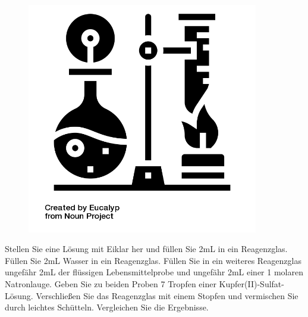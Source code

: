 \documentclass{scrartcl}  %
\begin{document}
		\begin{tcolorbox}[enhanced,
			colback=white,
			colframe=green!30!black,
			fonttitle=\sffamily\bfseries\large, 
			title=Durchführung,  %
			attach boxed title to top left={xshift=3.2mm,yshift=-0.50mm},
			boxed title style={skin=enhancedfirst jigsaw,size=small,arc=1mm,bottom=-1mm,colframe=green!50!black,height=0.75cm},
			colbacktitle=green!50!black,
			drop lifted shadow]
			\begin{figure}  
				\centering
				\vspace{-14pt}  %
				\includegraphics[width=0.9\textwidth]{symbols/symbol_tex_method}
			\end{figure}
			
			Stellen Sie eine Lösung mit Eiklar her und füllen Sie 2mL in ein Reagenzglas. Füllen Sie 2mL Wasser in ein Reagenzglas. Füllen Sie in ein weiteres Reagenzglas ungefähr 2mL der flüssigen Lebensmittelprobe und ungefähr 2mL einer 1 molaren Natronlauge. Geben Sie zu beiden Proben 7 Tropfen einer Kupfer(II)-Sulfat-Lösung. Verschließen Sie das Reagenzglas mit einem Stopfen und vermischen Sie durch leichtes Schütteln. Vergleichen Sie die Ergebnisse.
		\end{tcolorbox}
\end{document}

